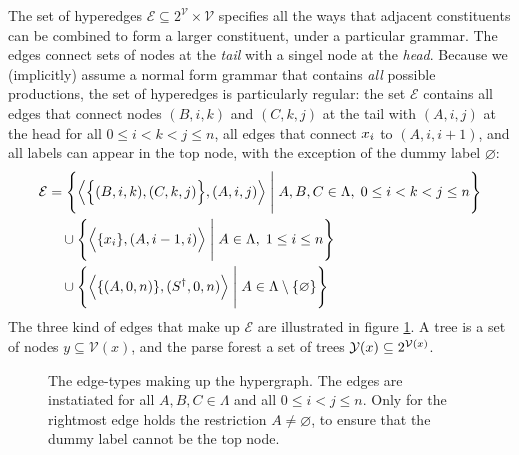     The set of hyperedges $\mathcal{E} \subseteq 2^{\mathcal{V}} \times \mathcal{V}$ specifies all the ways that adjacent constituents can be combined to form a larger constituent, under a particular grammar. The edges connect sets of nodes at the \textit{tail} with a singel node at the \textit{head}. Because we (implicitly) assume a normal form grammar that contains \textit{all} possible productions, the set of hyperedges is particularly regular: the set $\mathcal{E}$ contains all edges that connect nodes $(B, i, k)$ and $(C, k, j)$ at the tail with $(A, i, j)$ at the head for all $0 \leq i < k < j \leq n$, all edges that connect $\x_i$ to $(A, i, i+1)$, and all labels can appear in the top node, with the exception of the dummy label $\varnothing$:
    \begin{align*}
      \mathcal{E}
        &= \Bigg\{ \Big\langle \Big\{ (B, i, k), (C, k, j) \Big\},  (A, i, j) \Big\rangle \; \Bigg\vert \; A, B, C \in \Lambda, \; 0 \leq i < k < j \leq n \Bigg\}  \\
        &\quad\cup \Bigg\{ \Big\langle \{ \x_i \}, (A, i-1, i) \Big\rangle \; \Bigg\vert \; A \in \Lambda, \; 1 \leq i \leq n \Bigg\}  \\
        &\quad\cup \Bigg\{ \Big\langle \{ (A, 0, n) \}, (S^{\dagger}, 0, n) \Big\rangle \; \Bigg\vert \; A \in \Lambda \setminus \{ \varnothing \} \Bigg\}
    \end{align*}
    The three kind of edges that make up $\mathcal{E}$ are illustrated in figure \ref{fig:crf-edges}. A tree is a set of nodes $y \subseteq \mathcal{V}(x)$, and the parse forest a set of trees $\yieldx \subseteq 2^{\mathcal{V}(x)}$.

    \begin{figure}[h]
      \center
      \begin{tikzpicture}[scale=.6]
        
      \end{tikzpicture}
      \caption{The edge-types making up the hypergraph. The edges are instatiated for all $A, B, C \in \Lambda$ and all $0 \leq i < j \leq n$. Only for the rightmost edge holds the restriction $A \neq \varnothing$, to ensure that the dummy label cannot be the top node.}
      \label{fig:crf-edges}
    \end{figure}

